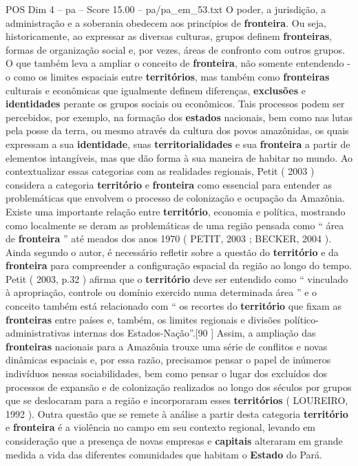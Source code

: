\begin{textsample}{POS Dim 4 – pa – Score 15.00 – pa/pa\_em\_53.txt}  \label{ex:f4_pos_006}
O poder, a jurisdição, a administração e a soberania obedecem aos princípios de \textbf{fronteira}.
Ou seja, historicamente, ao expressar as diversas culturas, grupos definem \textbf{fronteiras}, formas de organização social e, por vezes, áreas de confronto com outros grupos.
O que também leva a ampliar o conceito de \textbf{fronteira}, não somente entendendo -o como os limites espaciais entre \textbf{territórios}, mas também como \textbf{fronteiras} culturais e econômicas que igualmente definem diferenças, \textbf{exclusões} e \textbf{identidades} perante os grupos sociais ou econômicos.
Tais processos podem ser percebidos, por exemplo, na formação dos \textbf{estados} nacionais, bem como nas lutas pela posse da terra, ou mesmo através da cultura dos povos amazônidas, os quais expressam a sua \textbf{identidade}, suas \textbf{territorialidades} e sua \textbf{fronteira} a partir de elementos intangíveis, mas que dão forma à sua maneira de habitar no mundo.
Ao contextualizar essas categorias com as realidades regionais, Petit ( 2003 ) considera a categoria \textbf{território} e \textbf{fronteira} como essencial para entender as problemáticas que envolvem o processo de colonização e ocupação da Amazônia.
Existe uma importante relação entre \textbf{território}, economia e política, mostrando como localmente se deram as problemáticas de uma região pensada como “ área de \textbf{fronteira} ” até meados dos anos 1970 ( PETIT, 2003 ; BECKER, 2004 ).
Ainda segundo o autor, é necessário refletir sobre a questão do \textbf{território} e da \textbf{fronteira} para compreender a configuração espacial da região ao longo do tempo.
Petit ( 2003, p.32 ) afirma que o \textbf{território} deve ser entendido como “ vinculado à apropriação, controle ou domínio exercido numa determinada área ” e o conceito também está relacionado com “ os recortes do \textbf{território} que fixam as \textbf{fronteiras} entre países e, também, os limites regionais e divisões político-administrativas internas dos Estados-Nação”.[90 ] Assim, a ampliação das \textbf{fronteiras} nacionais para a Amazônia trouxe uma série de conflitos e novas dinâmicas espaciais e, por essa razão, precisamos pensar o papel de inúmeros indivíduos nessas sociabilidades, bem como pensar o lugar dos excluídos dos processos de expansão e de colonização realizados ao longo dos séculos por grupos que se deslocaram para a região e incorporaram esses \textbf{territórios} ( LOUREIRO, 1992 ).
Outra questão que se remete à análise a partir desta categoria \textbf{território} e \textbf{fronteira} é a violência no campo em seu contexto regional, levando em consideração que a presença de novas empresas e \textbf{capitais} alteraram em grande medida a vida das diferentes comunidades que habitam o \textbf{Estado} do Pará.

\end{textsample}
